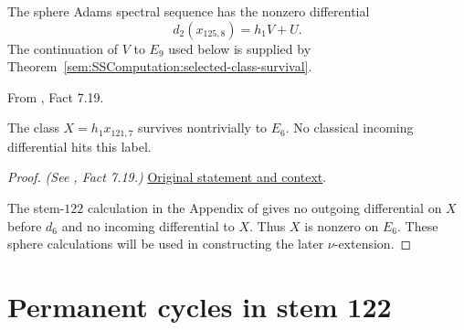 \begin{fact}
\label{paper:7.13}
\label{fact:x_123_9}\label{fact:x1239}
The sphere Adams spectral sequence has the nonzero differential
\[
 d_2(x_{125,8})=h_1V+U.
\]
The continuation of $V$ to $E_9$ used below is supplied by
Theorem~\ref{sem:SSComputation:selected-class-survival}.
\end{fact}

\begin{fact}
\label{paper:7.19}
From \cite{LWX126}, Fact 7.19.\par

\label{fact:h_1_mul_x_121_7}\label{fact:h1x1217}
    The class $X=h_1x_{121,7}$ survives nontrivially to $E_6$.
    No classical incoming differential hits this label.




\end{fact}
\begin{proof}
\textit{(See \cite{LWX126}, Fact 7.19.)} \href{paper/main.tex.html#L2613}{Original statement and context}.

The stem-$122$ calculation in the Appendix of \cite{LWX126} gives
no outgoing differential on $X$ before $d_6$ and no incoming
differential to $X$. Thus $X$ is nonzero on $E_6$. These sphere
calculations will be used in constructing the later $\nu$-extension.
\end{proof}

\section{Permanent cycles in stem 122}

